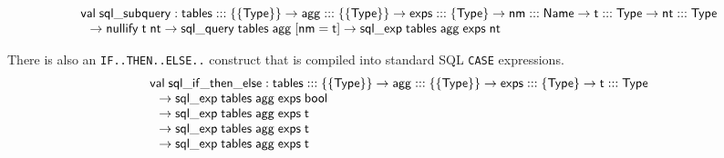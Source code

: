 \documentclass{article}
\newcommand{\cd}[1]{\texttt{#1}}
\newcommand{\mt}[1]{\mathsf{#1}}
\begin{document}
$$\begin{array}{l}
\mt{val} \; \mt{sql\_subquery} : \mt{tables} ::: \{\{\mt{Type}\}\} \to \mt{agg} ::: \{\{\mt{Type}\}\} \to \mt{exps} ::: \{\mt{Type}\} \to \mt{nm} ::: \mt{Name} \to \mt{t} ::: \mt{Type} \to \mt{nt} ::: \mt{Type} \\
\hspace{.1in} \to \mt{nullify} \; \mt{t} \; \mt{nt} \to \mt{sql\_query} \; \mt{tables} \; \mt{agg} \; [\mt{nm} = \mt{t}] \to \mt{sql\_exp} \; \mt{tables} \; \mt{agg} \; \mt{exps} \; \mt{nt}
\end{array}$$

There is also an \cd{IF..THEN..ELSE..} construct that is compiled into standard SQL \cd{CASE} expressions.
$$\begin{array}{l}
\mt{val} \; \mt{sql\_if\_then\_else} : \mt{tables} ::: \{\{\mt{Type}\}\} \to \mt{agg} ::: \{\{\mt{Type}\}\} \to \mt{exps} ::: \{\mt{Type}\} \to \mt{t} ::: \mt{Type} \\
\hspace{.1in} \to \mt{sql\_exp} \; \mt{tables} \; \mt{agg} \; \mt{exps} \; \mt{bool} \\
\hspace{.1in} \to \mt{sql\_exp} \; \mt{tables} \; \mt{agg} \; \mt{exps} \; \mt{t} \\
\hspace{.1in} \to \mt{sql\_exp} \; \mt{tables} \; \mt{agg} \; \mt{exps} \; \mt{t} \\
\hspace{.1in} \to \mt{sql\_exp} \; \mt{tables} \; \mt{agg} \; \mt{exps} \; \mt{t}
\end{array}$$
\end{document}
